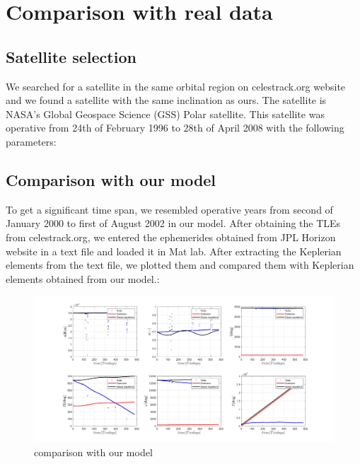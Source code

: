 \documentclass[11pt,a4paper]{report}
\begin{document}
\section{Comparison with real data}

\subsection{Satellite selection}
We searched for a satellite in the same orbital region on celestrack.org website and we found a satellite with the same inclination as ours. 
The satellite is NASA’s Global Geospace Science (GSS) Polar satellite.
This satellite was operative from 24th of February 1996 to 28th of April 2008 with the following parameters:


\begin{table}[H]
\centering
{}
\end{table}
\subsection{Comparison with our model}

To get a significant time span, we resembled operative years from second of January 2000 to first of August 2002 in our model. After obtaining the TLEs from celestrack.org, we entered the ephemerides obtained from JPL Horizon website in a text file and loaded it in Mat lab. After extracting the Keplerian elements from the text file, we plotted them  and compared them with Keplerian elements obtained from our model.: 

\begin{figure}[H]
\centering
\includegraphics[width=1\textwidth]{comparisonwithtles}
\caption{comparison with our model}
\end{figure}
\end{document}
